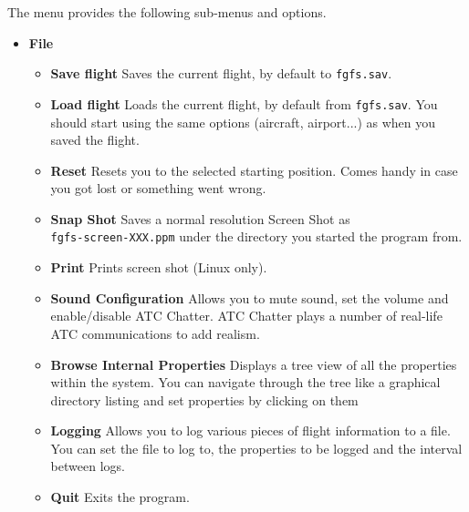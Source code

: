 The menu provides the following sub-menus and options.

\begin{itemize}
 \item \textbf{File}
 \begin{itemize}
  \item \textbf{Save flight} Saves the current flight, by
default to \texttt{fgfs.sav}.
 \item \textbf{Load flight} Loads the current flight, by
default from \texttt{fgfs.sav}. You should
start \FlightGear{} using the same options (aircraft, airport...) as when you
saved the flight.
 \item \textbf{Reset} Resets you to the selected starting
position. 
 Comes handy in case you got lost or something went wrong.
  \item \textbf{Snap Shot} Saves a normal resolution Screen
Shot as \\ \texttt{fgfs-screen-XXX.ppm} under 
  the directory you started the program from.
  \item \textbf{Print} Prints screen shot (Linux only).
  \item \textbf{Sound Configuration} Allows you to mute sound, set the volume
and enable/disable ATC Chatter. 
  ATC Chatter plays a number of real-life ATC communications to add realism.
  \item \textbf{Browse Internal Properties} Displays a tree view of all the
properties within the system. 
  You can navigate through the tree like a graphical directory listing and set
properties by clicking on them
  \item \textbf{Logging} Allows you to log various pieces of flight information
to a file. 
  You can set the file to log to, the properties to be logged and the interval
between logs. 
  \item \textbf{Quit} Exits the program.
 \end{itemize}


\end{itemize}
